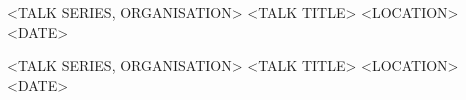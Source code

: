


\begin{cventries}

\cventry
{<TALK SERIES, ORGANISATION>} %
{ <TALK TITLE>} %
{<LOCATION>} %
{<DATE>} %
{}
\vspace{-0.5cm}


\cventry
{<TALK SERIES, ORGANISATION>} %
{ <TALK TITLE>} %
{<LOCATION>} %
{<DATE>} %
{}
\vspace{-0.5cm}


\end{cventries}